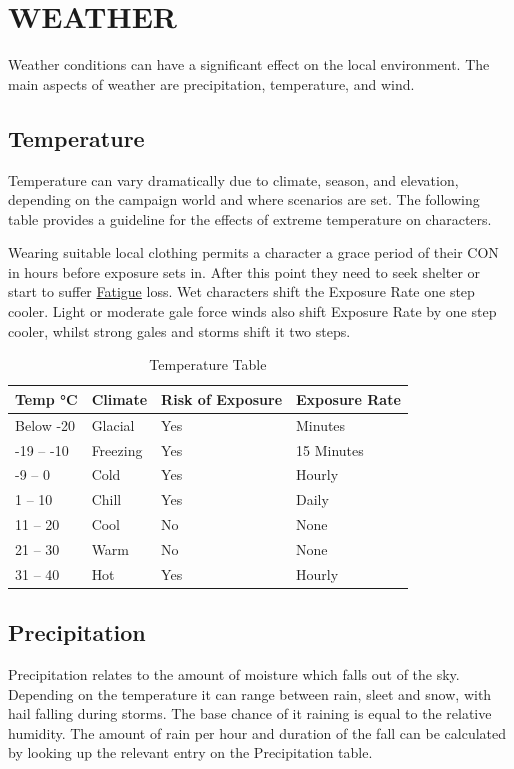 \documentclass[10pt]{article}
\begin{document}
\section{WEATHER}
\label{sec:weather}
Weather conditions can have a significant effect on the local environment. The main aspects of weather are precipitation, temperature, and wind. 

\subsection{Temperature}
\label{sec:temperature}
Temperature can vary dramatically due to climate, season, and elevation, depending on the campaign world and where scenarios are set. The following table provides a guideline for the effects of extreme temperature on characters.

Wearing suitable local clothing permits a character a grace period of their CON in hours before exposure sets in. After this point they need to seek shelter or start to suffer \hyperref[sec:fatigue]{Fatigue} loss. Wet characters shift the Exposure Rate one step cooler. Light or moderate gale force winds also shift Exposure Rate by one step cooler, whilst strong gales and storms shift it two steps.

\begin{table}[h]
\centering
\caption{Temperature Table}
\label{tab:temperature}
\begin{tabular}{llll}
\toprule
\textbf{Temp °C} & \textbf{Climate} & \textbf{Risk of Exposure} & \textbf{Exposure Rate} \\
\midrule
Below -20 & Glacial & Yes & Minutes \\
-19 – -10 & Freezing & Yes & 15 Minutes \\
-9 – 0 & Cold & Yes & Hourly \\
1 – 10 & Chill & Yes & Daily \\
11 – 20 & Cool & No & None \\
21 – 30 & Warm & No & None \\
31 – 40 & Hot & Yes & Hourly \\
\bottomrule
\end{tabular}
\end{table}

\subsection{Precipitation}
\label{sec:precipitation}
Precipitation relates to the amount of moisture which falls out of the sky. Depending on the temperature it can range between rain, sleet and snow, with hail falling during storms. The base chance of it raining is equal to the relative humidity. The amount of rain per hour and duration of the fall can be calculated by looking up the relevant entry on the Precipitation table.
\end{document}
